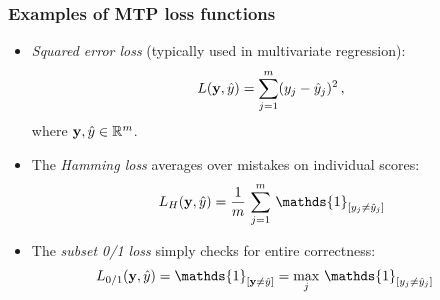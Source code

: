 \documentclass[11pt,compress,t,notes=noshow, xcolor=table]{beamer}
\begin{document}
\begin{frame}
	\frametitle{Examples of MTP loss functions}
	\begin{itemize}
		
		\small 
		\item \emph{Squared error loss} (typically used in multivariate regression):
		$$
		L(\mathbf{y}, \hat{y}) = \sum_{j=1}^m (y_j - \hat{y}_j)^2 \, ,
		$$
		where $\mathbf{y} , \hat{y} \in \mathbb{R}^m$.
		
		
		\medskip
		
		
		
		
		\item The \emph{Hamming loss} averages over mistakes on individual scores:    
		$$
		\displaystyle L_H(\yv, \hat{y}) = \frac{1}{m}  \, \sum_{j=1}^m \, \mathds{1}_{[y_j \neq  \hat y_j ]}
		$$
		
		\item The \emph{subset 0/1 loss} simply checks for entire correctness:  
		\begin{align*}
			\displaystyle L_{0/1}(\yv, \hat{y}) & = \mathds{1}_{[ \yv \ne \hat{y} ]}  =  \max_j \, \mathds{1}_{[y_j \neq  \hat y_j]}
		\end{align*}
		
		
	\end{itemize}
\end{frame}
\end{document}
